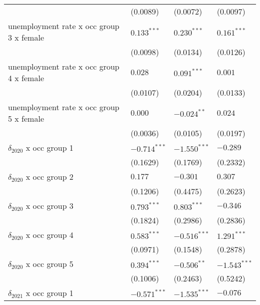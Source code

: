 \begin{tabular}{llll}
                                         &           (0.0089) &           (0.0072) &           (0.0097) \\
unemployment rate x occ group 3 x female &      $0.133^{***}$ &      $0.230^{***}$ &      $0.161^{***}$ \\
                                         &           (0.0098) &           (0.0134) &           (0.0126) \\
unemployment rate x occ group 4 x female &            $0.028$ &      $0.091^{***}$ &            $0.001$ \\
                                         &           (0.0107) &           (0.0204) &           (0.0133) \\
unemployment rate x occ group 5 x female &            $0.000$ &      $-0.024^{**}$ &            $0.024$ \\
                                         &           (0.0036) &           (0.0105) &           (0.0197) \\
$\delta_{2020}$ x occ group 1            &     $-0.714^{***}$ &     $-1.550^{***}$ &           $-0.289$ \\
                                         &           (0.1629) &           (0.1769) &           (0.2332) \\
$\delta_{2020}$ x occ group 2            &            $0.177$ &           $-0.301$ &            $0.307$ \\
                                         &           (0.1206) &           (0.4475) &           (0.2623) \\
$\delta_{2020}$ x occ group 3            &      $0.793^{***}$ &      $0.803^{***}$ &           $-0.346$ \\
                                         &           (0.1824) &           (0.2986) &           (0.2836) \\
$\delta_{2020}$ x occ group 4            &      $0.583^{***}$ &     $-0.516^{***}$ &      $1.291^{***}$ \\
                                         &           (0.0971) &           (0.1548) &           (0.2878) \\
$\delta_{2020}$ x occ group 5            &      $0.394^{***}$ &      $-0.506^{**}$ &     $-1.543^{***}$ \\
                                         &           (0.1006) &           (0.2463) &           (0.5242) \\
$\delta_{2021}$ x occ group 1            &     $-0.571^{***}$ &     $-1.535^{***}$ &           $-0.076$ \\

\end{tabular}
